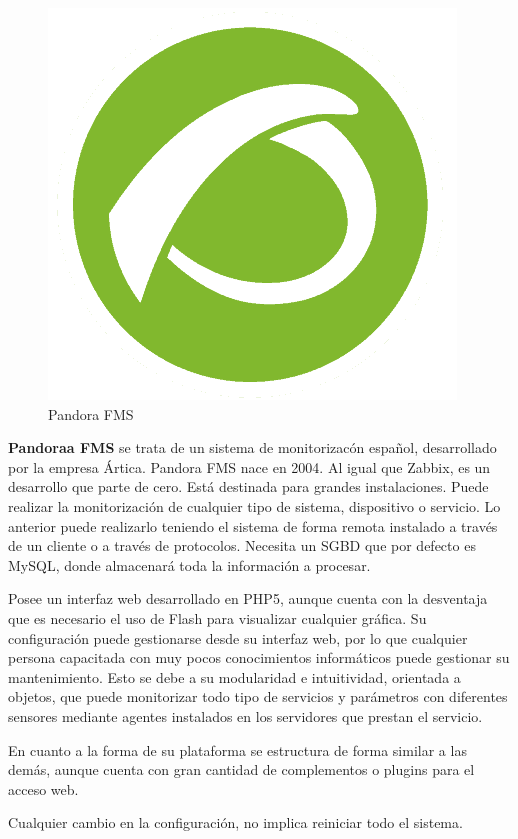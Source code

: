 \begin{figure}[H]
	\centering
	\includegraphics[scale=0.4]{imagenes/logos_monitorizacion/pandora.png}
	\caption{Pandora FMS} \label{pandora}
\end{figure}
\textbf{Pandoraa FMS}\cite{pandora} se trata de un sistema de monitorizacón español, desarrollado por la empresa Ártica. Pandora FMS nace en 2004. Al igual que Zabbix, es un desarrollo que parte de cero. Está destinada para grandes instalaciones. Puede realizar la monitorización de cualquier tipo de sistema, dispositivo o servicio. Lo anterior puede realizarlo teniendo el sistema de forma remota instalado a través de un cliente o a través de protocolos. Necesita un SGBD que por defecto es MySQL, donde almacenará toda la información a procesar.

Posee un interfaz web desarrollado en PHP5, aunque cuenta con la desventaja que es necesario el uso de Flash para visualizar cualquier gráfica. Su configuración puede gestionarse desde su interfaz web, por lo que cualquier persona capacitada con muy pocos conocimientos informáticos puede gestionar su mantenimiento. Esto se debe a su modularidad e intuitividad, orientada a objetos, que puede monitorizar todo tipo de servicios y parámetros con
diferentes sensores mediante agentes instalados en los
servidores que prestan el servicio.
 
En cuanto a la forma de su plataforma se estructura de forma similar a las demás, aunque cuenta con gran cantidad de complementos o plugins para el acceso web.

Cualquier cambio en la configuración, no implica reiniciar todo el sistema.

